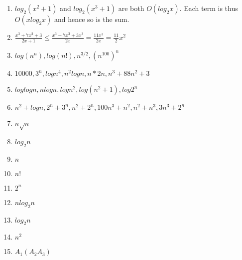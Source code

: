 \documentclass[11pt]{article}
\begin{document}
\begin{enumerate}
\item $log_2(x^2+1)$ and $log_2(x^3+1)$ are both $O(log_2x)$. Each term is thus $O(xlog_2x)$ and hence so is the sum.
\item $\frac{x^3+7x^2+3}{2x+1} \leq \frac{x^3+7x^3+3x^3}{2x} = \frac{11x^3}{2x} = \frac{11}{2}x^2$
\item $log(n^n), log(n!), n^{3/2}, (n^{100})^n$
\item $10000, 3^n, logn^4, n^2logn, n*2n, n^3+88n^2+3$
\item $loglogn,nlogn,logn^2,log(n^2+1),log2^n$
\item $n^2+logn,2^n+3^n,n^2+2^n,100n^3+n^2,n^2+n^3,3n^3+2^n$
\item $n\sqrt{n}$
\item $log_2n$
\item $n$
\item $n!$
\item $2^n$
\item $nlog_2n$
\item $log_2n$
\item $n^2$
\item $A_1(A_2A_3)$

\end{enumerate}
\end{document}
